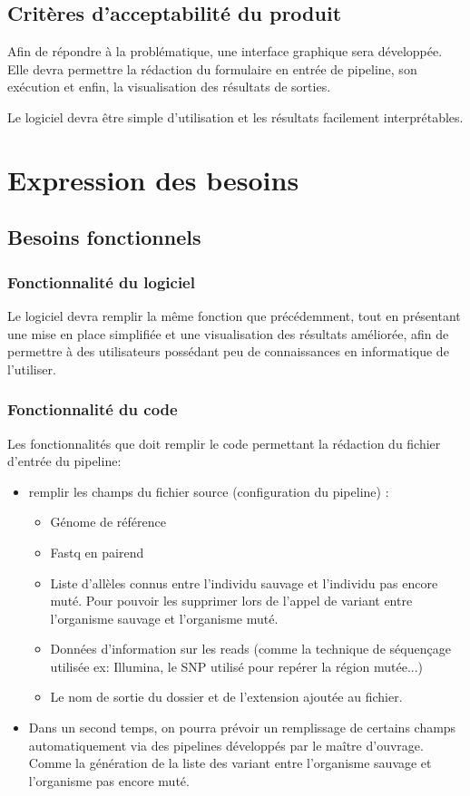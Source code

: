 \documentclass[12pt]{article}
\begin{document}
\subsection{Critères d'acceptabilité du produit}

Afin de répondre à la problématique, une interface graphique sera développée. Elle devra permettre la rédaction du formulaire en entrée de pipeline, son exécution et enfin, la visualisation des résultats de sorties.

Le logiciel devra être simple d'utilisation et les résultats facilement interprétables.

\section{Expression des besoins}
\subsection{Besoins fonctionnels}

\newpage

\subsubsection{Fonctionnalité du logiciel}

Le logiciel devra remplir la même fonction que précédemment, tout en présentant une mise en place simplifiée et une visualisation des résultats améliorée, afin de permettre à des utilisateurs possédant peu de connaissances en informatique de l'utiliser.

\subsubsection{Fonctionnalité du code}

Les fonctionnalités que doit remplir le code permettant la rédaction du fichier d'entrée du pipeline:

\begin{itemize}
\item remplir les champs du fichier source (configuration du pipeline) :
\begin{itemize}
\item Génome de référence
\item Fastq en pairend 
\item Liste d'allèles connus entre l'individu sauvage et l’individu pas encore muté. Pour pouvoir les supprimer lors de l'appel de variant entre l'organisme sauvage et l'organisme muté. 
\item Données d'information sur les reads (comme la technique de séquençage utilisée ex: Illumina, le SNP utilisé pour repérer la région mutée...)
\item Le nom de sortie du dossier et de l’extension ajoutée au fichier.
\end{itemize}
\item Dans un second temps, on pourra prévoir un remplissage de certains champs automatiquement via des pipelines développés par le maître d'ouvrage. Comme la génération de la liste des variant entre l'organisme sauvage et l'organisme pas encore muté.
\end{itemize}
\end{document}
